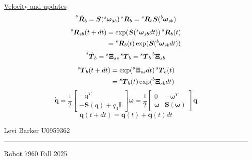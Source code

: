 \documentclass[twocolumn]{article}    %
\begin{document}
\newpage
\noindent\underline{Velocity and updates}
\begin{equation*}
    \prescript{s}{}{\dot{\bm{R}}}_b = \bm{S}(\prescript{s}{}{\bm{\omega}}_{sb}) \prescript{s}{}{\bm{R}}_b = \prescript{s}{}{\bm{R}}_b \bm{S}(\prescript{b}{}{\bm{\omega}}_{sb}) 
\end{equation*}
\begin{align*}    
    \prescript{s}{}{\bm{R}}_{sb}(t+dt)  &= \operatorname{exp}(\bm{S}(\prescript{s}{}{\bm{\omega}}_{sb} dt))\prescript{s}{}{\bm{R}}_b(t)\\
    &= \prescript{s}{}{\bm{R}}_b(t) \operatorname{exp}(\bm{S}(\prescript{b}{}{\bm{\omega}}_{sb} dt))
\end{align*}\begin{equation*}
    \prescript{s}{}{\dot{\bm{T}}}_b = \prescript{s}{}{\bm{\Xi}}_{ss} \prescript{s}{}{\bm{T}}_b = \prescript{s}{}{\bm{T}}_b \prescript{b}{}{\bm{\Xi}}_{sb} 
\end{equation*}
\begin{align*}
    \prescript{s}{}{\bm{T}}_b(t+dt) &= \operatorname{exp}(\prescript{s}{}{\bm{\Xi}}_{ss}dt) \prescript{s}{}{\bm{T}}_b(t)\\
    &= \prescript{s}{}{\bm{T}}_b(t) \operatorname{exp}(\prescript{b}{}{\bm{\Xi}}_{sb}dt) 
\end{align*}
\begin{equation*}
    \dot{\bm{q}} = \frac{1}{2}\begin{bmatrix}
        -\text{q}^T\\ -\bm{S}(\text{q}) + q_0\bm{I}
    \end{bmatrix}\bm{\omega} = \frac{1}{2}\begin{bmatrix}
        0 &-\bm{\omega}^T\\ \bm{\omega} & \bm{S}(\bm{\omega})
    \end{bmatrix} \bm{q}
\end{equation*}
\begin{equation*}
    \bm{q}(t+dt) = \bm{q}(t) +\dot{\bm{q}}(t)dt
\end{equation*}
\vfill
\begin{center}    
    Levi Barker \hspace{82pt} U0959362 \\ \vspace{2pt}
    \hrule
    \vspace{2pt}
    Robot 7960 \hspace{85pt} Fall 2025
\end{center}
\end{document}
